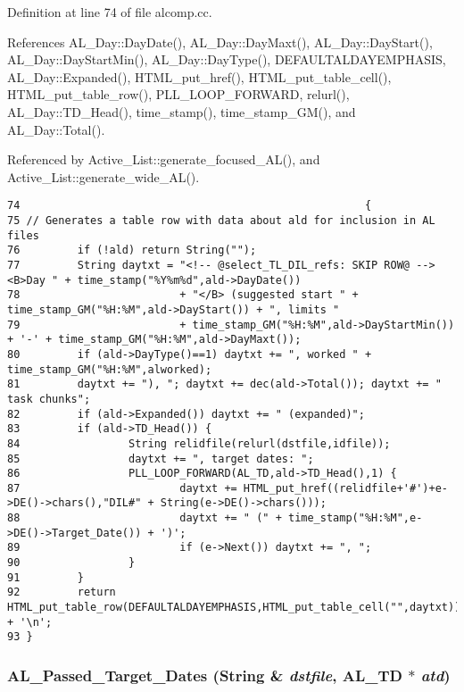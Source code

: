 Definition at line 74 of file alcomp.cc.

References AL\_\-Day::Day\-Date(), AL\_\-Day::Day\-Maxt(), AL\_\-Day::Day\-Start(), AL\_\-Day::Day\-Start\-Min(), AL\_\-Day::Day\-Type(), DEFAULTALDAYEMPHASIS, AL\_\-Day::Expanded(), HTML\_\-put\_\-href(), HTML\_\-put\_\-table\_\-cell(), HTML\_\-put\_\-table\_\-row(), PLL\_\-LOOP\_\-FORWARD, relurl(), AL\_\-Day::TD\_\-Head(), time\_\-stamp(), time\_\-stamp\_\-GM(), and AL\_\-Day::Total().

Referenced by Active\_\-List::generate\_\-focused\_\-AL(), and Active\_\-List::generate\_\-wide\_\-AL().



\footnotesize\begin{verbatim}74                                                      {
75 // Generates a table row with data about ald for inclusion in AL files
76         if (!ald) return String("");
77         String daytxt = "<!-- @select_TL_DIL_refs: SKIP ROW@ --><B>Day " + time_stamp("%Y%m%d",ald->DayDate())
78                         + "</B> (suggested start " + time_stamp_GM("%H:%M",ald->DayStart()) + ", limits "
79                         + time_stamp_GM("%H:%M",ald->DayStartMin()) + '-' + time_stamp_GM("%H:%M",ald->DayMaxt());
80         if (ald->DayType()==1) daytxt += ", worked " + time_stamp_GM("%H:%M",alworked);
81         daytxt += "), "; daytxt += dec(ald->Total()); daytxt += " task chunks";
82         if (ald->Expanded()) daytxt += " (expanded)";
83         if (ald->TD_Head()) {
84                 String relidfile(relurl(dstfile,idfile));
85                 daytxt += ", target dates: ";
86                 PLL_LOOP_FORWARD(AL_TD,ald->TD_Head(),1) {
87                         daytxt += HTML_put_href((relidfile+'#')+e->DE()->chars(),"DIL#" + String(e->DE()->chars()));
88                         daytxt += " (" + time_stamp("%H:%M",e->DE()->Target_Date()) + ')';
89                         if (e->Next()) daytxt += ", ";
90                 }
91         }
92         return HTML_put_table_row(DEFAULTALDAYEMPHASIS,HTML_put_table_cell("",daytxt)) + '\n';
93 }
\end{verbatim}\normalsize 
{}
\subsubsection{ AL\_\-Passed\_\-Target\_\-Dates ({\bf String} \& {\em dstfile}, {\bf AL\_\-TD} $\ast$ {\em atd})}\label{alcomp_8cc_a7}




